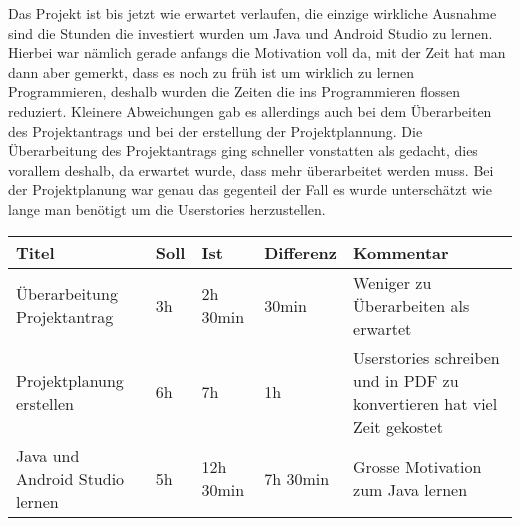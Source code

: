 \documentclass{report}
\begin{document}
Das Projekt ist bis jetzt wie erwartet verlaufen, die einzige wirkliche Ausnahme sind die Stunden die investiert wurden um Java und Android Studio zu lernen. Hierbei war nämlich gerade anfangs die Motivation voll da, mit der Zeit hat man dann aber gemerkt, dass es noch zu früh ist um wirklich zu lernen Programmieren, deshalb wurden die Zeiten die ins Programmieren flossen reduziert. Kleinere Abweichungen gab es allerdings auch bei dem Überarbeiten des Projektantrags und bei der erstellung der Projektplannung. Die Überarbeitung des Projektantrags ging schneller vonstatten als gedacht, dies vorallem deshalb, da erwartet wurde, dass mehr überarbeitet werden muss. Bei der Projektplanung war genau das gegenteil der Fall es wurde unterschätzt wie lange man benötigt um die Userstories herzustellen. \newline \newline \newline
\begin{tabular}{p{}|p{}|p{}|p{}|p{}}
    \textbf{Titel} & \textbf{Soll} & \textbf{Ist} & \textbf{Differenz} & \textbf{Kommentar} \\ \hline
    Überarbeitung Projektantrag & 3h & 2h 30min & 30min & Weniger zu Überarbeiten als erwartet \\ \hline
    Projektplanung erstellen & 6h & 7h & 1h & Userstories schreiben und in PDF zu konvertieren hat viel Zeit gekostet \\ \hline
    Java und Android Studio lernen & 5h & 12h 30min & 7h 30min & Grosse Motivation zum Java lernen
\end{tabular}

\printbibliography
\end{document}
